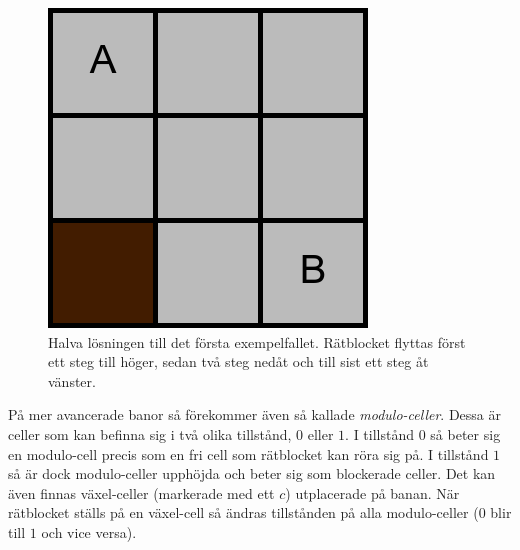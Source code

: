 \begin{figure}[!htb]
\endminipage\hfill
{}
\includegraphics[width=\linewidth]{4.png}
\endminipage
\caption{Halva lösningen till det första exempelfallet. Rätblocket flyttas först ett steg till höger, sedan två steg nedåt och till sist ett steg åt vänster.}
\end{figure}

\noindent På mer avancerade banor så förekommer även så kallade \emph{modulo-celler}. Dessa är celler som kan befinna sig i två olika tillstånd, $0$ eller $1$. I tillstånd $0$ så beter sig en modulo-cell precis som en fri cell som rätblocket kan röra sig på. I tillstånd $1$ så är dock modulo-celler upphöjda och beter sig som blockerade celler. Det kan även finnas växel-celler (markerade med ett $c$) utplacerade på banan. När rätblocket ställs på en växel-cell så ändras tillstånden på alla modulo-celler ($0$ blir till $1$ och vice versa).

